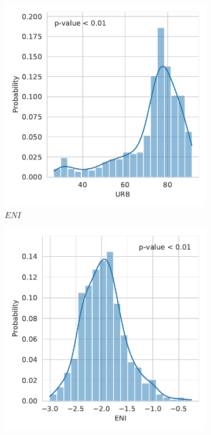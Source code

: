 \documentclass[12pt,a4paper]{article}
\begin{document}
\begin{figure}[htbp]\ContinuedFloat
\centering
\begin{subfigure}{0.45\textwidth}
\includegraphics[width=\textwidth]{./plots/dis/distplot_URB.pdf}
\caption{$ENI$}
\end{subfigure}
\begin{subfigure}{0.45\textwidth}
\includegraphics[width=\textwidth]{./plots/dis/distplot_lnENI.pdf}

\end{subfigure}
\end{figure}
\end{document}
